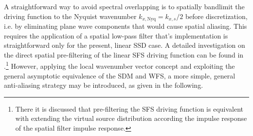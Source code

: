 A straightforward way to avoid spectral overlapping is to spatially bandlimit the driving function to the Nyquist wavenumber $k_{x,\mathrm{Nyq}} = k_{x,s}/2$ before discretization, i.e. by eliminating plane wave components that would cause spatial aliasing.
This requires the application of a spatial low-pass filter that's implementation is straightforward only for the present, linear SSD case.
A detailed investigation on the direct spatial pre-filtering of the linear SFS driving function can be found in \cite{Firtha2012:isma, Ahrens2012}.\footnote{There it is discussed that pre-filtering the SFS driving function is equivalent with extending the virtual source distribution according the impulse response of the spatial filter impulse response.}
However, applying the local wavenumber vector concept and exploiting the general asymptotic equivalence of the SDM and WFS, a more simple, general anti-aliasing strategy may be introduced, as given in the following.

